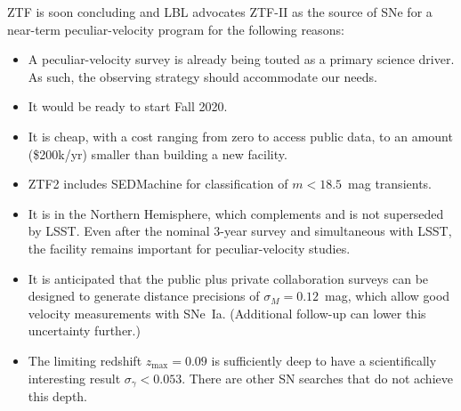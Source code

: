 ZTF is soon concluding and LBL advocates ZTF-II as the source of SNe for a near-term peculiar-velocity program
for the following reasons:
\begin{itemize}
\item A peculiar-velocity survey is already being touted as a primary science driver. As such,
the observing strategy should accommodate our needs.
\item It would be ready to start Fall 2020.
\item It is cheap, with a cost ranging from zero to access public data, to an amount (\$200k/yr) smaller
than building a new facility.
\item ZTF2 includes SEDMachine for classification of $m<18.5$~mag  transients.
\item It is in the Northern Hemisphere, which complements and is not superseded by LSST. 
Even after the nominal 3-year survey and simultaneous with LSST, the facility remains important for peculiar-velocity studies.
\item It is anticipated that the public plus private collaboration surveys can be designed to generate distance
precisions of $\sigma_M =0.12$~mag, which allow good velocity measurements with SNe~Ia.  (Additional follow-up can lower this uncertainty further.)
\item The limiting redshift $z_{\text{max}} =0.09$ is sufficiently deep  to have a scientifically interesting result $\sigma_\gamma < 0.053$.
There are other SN searches that do not achieve this depth.
\end{itemize}

